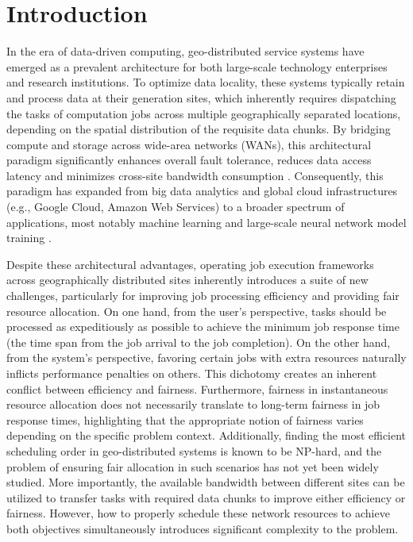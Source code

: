 
\chapter{Introduction} %
\label{ch:introduction} %



In the era of data-driven computing, geo-distributed service systems have emerged as a prevalent architecture for both large-scale technology enterprises and research institutions. To optimize data locality, these systems typically retain and process data at their generation sites, which inherently requires dispatching the tasks of computation jobs across multiple geographically separated locations, depending on the spatial distribution of the requisite data chunks. By bridging compute and storage across wide-area networks (WANs), this architectural paradigm significantly enhances overall fault tolerance, reduces data access latency and minimizes cross-site bandwidth consumption \cite{hogade2022survey, bergui2021survey}. Consequently, this paradigm has expanded from big data analytics \cite{wu2017towards} and global cloud infrastructures (e.g., Google Cloud, Amazon Web Services) to a broader spectrum of applications, most notably machine learning \cite{hsieh2017gaia} and large-scale neural network model training \cite{tang2024fusionllm, wang2025spantrain}.

Despite these architectural advantages, operating job execution frameworks across geographically distributed sites inherently introduces a suite of new challenges, particularly for improving job processing efficiency and providing fair resource allocation. On one hand, from the user's perspective, tasks should be processed as expeditiously as possible to achieve the minimum job response time (the time span from the job arrival to the job completion). On the other hand, from the system's perspective, favoring certain jobs with extra resources naturally inflicts performance penalties on others. This dichotomy creates an inherent conflict between efficiency and fairness. Furthermore, fairness in instantaneous resource allocation does not necessarily translate to long-term fairness in job response times, highlighting that the appropriate notion of fairness varies depending on the specific problem context. Additionally, finding the most efficient scheduling order in geo-distributed systems is known to be NP-hard, and the problem of ensuring fair allocation in such scenarios has not yet been widely studied. More importantly, the available bandwidth between different sites can be utilized to transfer tasks with required data chunks to improve either efficiency or fairness. However, how to properly schedule these network resources to achieve both objectives simultaneously introduces significant complexity to the problem. 

